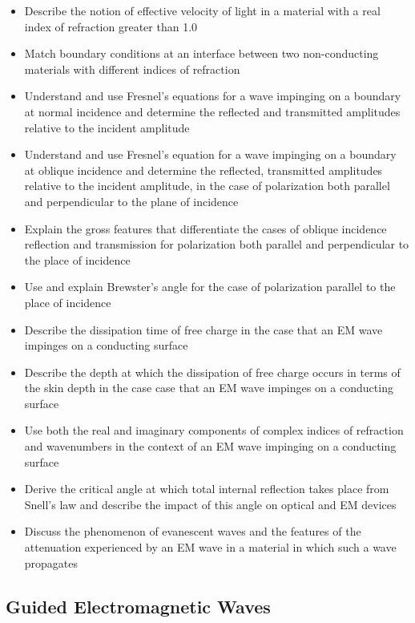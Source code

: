 \documentclass[12pt]{article}
\begin{document}
\begin{itemize}  
  \item Describe the notion of effective velocity of light in a material with a real index of refraction greater than 1.0
  \item Match boundary conditions at an interface between two non-conducting materials with different indices of refraction
  \item Understand and use Fresnel's equations for a wave impinging on a boundary at normal incidence and determine the reflected and transmitted amplitudes relative to the incident amplitude
  \item Understand and use Fresnel's equation for a wave impinging on a boundary at oblique incidence  and determine the reflected, transmitted amplitudes relative to the incident amplitude, in the case of polarization both parallel and perpendicular to the plane of incidence
  \item Explain the gross features that differentiate the cases of oblique incidence reflection and transmission for polarization both parallel and perpendicular to the place of incidence
  \item Use and explain Brewster's angle for the case of polarization parallel to the place of incidence
  \item Describe the dissipation time of free charge in the case that an EM wave impinges on a conducting surface
  \item Describe the depth at which the dissipation of free charge occurs in terms of the skin depth in the case case that an EM wave impinges on a conducting surface
  \item Use both the real and imaginary components of complex indices of refraction and wavenumbers in the context of an EM wave impinging on a conducting surface
  \item Derive the critical angle at which total internal reflection takes place from Snell's law and describe the impact of this angle on optical and EM devices
  \item Discuss the phenomenon of evanescent waves and the features of the attenuation experienced by an EM wave in a material in which such a wave propagates
\end{itemize}

\subsection*{Guided Electromagnetic Waves}
\end{document}
